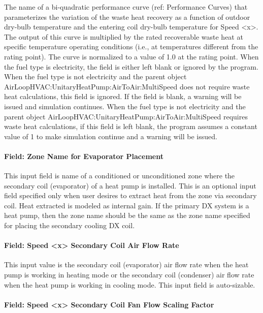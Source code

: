 The name of a bi-quadratic performance curve (ref: Performance Curves) that parameterizes the variation of the waste heat recovery as a function of outdoor dry-bulb temperature and the entering coil dry-bulb temperature for Speed \textless{}x\textgreater{}. The output of this curve is multiplied by the rated recoverable waste heat at specific temperature operating conditions (i.e., at temperatures different from the rating point). The curve is normalized to a value of 1.0 at the rating point. When the fuel type is electricity, the field is either left blank or ignored by the program. When the fuel type is not electricity and the parent object AirLoopHVAC:UnitaryHeatPump:AirToAir:MultiSpeed does not require waste heat calculations, this field is ignored. If the field is blank, a warning will be issued and simulation continues. When the fuel type is not electricity and the parent object AirLoopHVAC:UnitaryHeatPump:AirToAir:MultiSpeed requires waste heat calculations, if this field is left blank, the program assumes a constant value of 1 to make simulation continue and a warning will be issued.

\paragraph{Field: Zone Name for Evaporator Placement}\label{field-zone-name-for-evaporator-placement-1}

This input field is name of a conditioned or unconditioned zone where the secondary coil (evaporator) of a heat pump is installed. This is an optional input field specified only when user desires to extract heat from the zone via secondary coil. Heat extracted is modeled as internal gain. If the primary DX system is a heat pump, then the zone name should be the same as the zone name specified for placing the secondary cooling DX coil.

\paragraph{Field: Speed \textless{}x\textgreater{} Secondary Coil Air Flow Rate}\label{field-speed-x-secondary-coil-air-flow-rate}

This input value is the secondary coil (evaporator) air flow rate when the heat pump is working in heating mode or the secondary coil (condenser) air flow rate when the heat pump is working in cooling mode. This input field is auto-sizable.

\paragraph{Field: Speed \textless{}x\textgreater{} Secondary Coil Fan Flow Scaling Factor}\label{field-speed-x-secondary-coil-fan-flow-scaling-factor}

